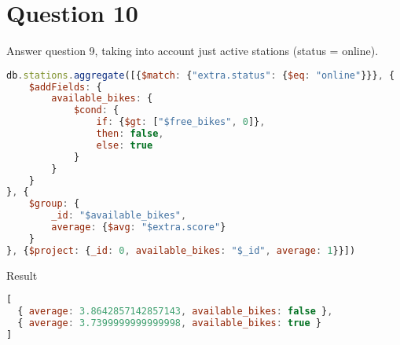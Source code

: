 \section{Question 10}

\begin{question}
  Answer question 9, taking into account just active stations (status =
  online).
\end{question}

\begin{answer}

  \begin{lstlisting}[language=js]
db.stations.aggregate([{$match: {"extra.status": {$eq: "online"}}}, {
    $addFields: {
        available_bikes: {
            $cond: {
                if: {$gt: ["$free_bikes", 0]},
                then: false,
                else: true
            }
        }
    }
}, {
    $group: {
        _id: "$available_bikes",
        average: {$avg: "$extra.score"}
    }
}, {$project: {_id: 0, available_bikes: "$_id", average: 1}}])
  \end{lstlisting}
  Result
  \begin{lstlisting}[language=js]
[
  { average: 3.8642857142857143, available_bikes: false },
  { average: 3.7399999999999998, available_bikes: true }
]
  \end{lstlisting}

\end{answer}
\pagebreak
